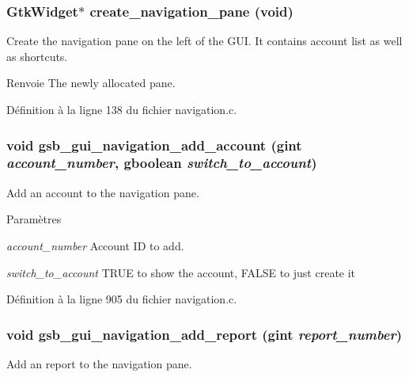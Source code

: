 \subsubsection[{create\_\-navigation\_\-pane}]{\setlength{\rightskip}{0pt plus 5cm}GtkWidget$\ast$ create\_\-navigation\_\-pane (void)}\label{navigation_8h_a9213ab9c2e1f3d5d558517a5bac09a5b}
Create the navigation pane on the left of the GUI. It contains account list as well as shortcuts.

\begin{DoxyReturn}{Renvoie}
The newly allocated pane. 
\end{DoxyReturn}


Définition à la ligne 138 du fichier navigation.c.

\subsubsection[{gsb\_\-gui\_\-navigation\_\-add\_\-account}]{\setlength{\rightskip}{0pt plus 5cm}void gsb\_\-gui\_\-navigation\_\-add\_\-account (gint {\em account\_\-number}, \/  gboolean {\em switch\_\-to\_\-account})}\label{navigation_8h_acc4cb91805c595677dcc822498171ece}
Add an account to the navigation pane.


\begin{DoxyParams}{Paramètres}
\item[{\em account\_\-number}]Account ID to add. \item[{\em switch\_\-to\_\-account}]TRUE to show the account, FALSE to just create it \end{DoxyParams}


Définition à la ligne 905 du fichier navigation.c.

\subsubsection[{gsb\_\-gui\_\-navigation\_\-add\_\-report}]{\setlength{\rightskip}{0pt plus 5cm}void gsb\_\-gui\_\-navigation\_\-add\_\-report (gint {\em report\_\-number})}\label{navigation_8h_a6c19e82e10a0dd98a3a20290a3a873ec}
Add an report to the navigation pane.


